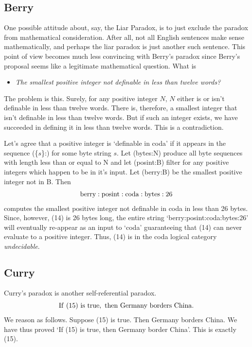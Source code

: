 \documentclass[11pt]{article}
\begin{document}
\subsection{Berry}

     One possible attitude about, say, the Liar Paradox, is to just exclude 
the paradox from mathematical consideration.  After all, not all English sentences make sense mathematically, and perhaps the liar paradox is just another such sentence.  
This point of view becomes much less convincing with Berry's paradox\cite{Berry} since Berry's proposal 
 seems like a legitimate mathematical question.  What is 
 \begin{itemize}
 \item {\it The smallest positive integer not definable in less than twelve words?}
 \end{itemize}
The problem is this.  Surely, for any positive integer $N$, $N$ either is or isn't definable in less than twelve words.
There is, therefore, a smallest integer that isn't definable in less than twelve words.  But if such an integer exists, we have succeeded in defining it in
less than twelve words.  This is a contradiction.

    Let's agree that a positive integer is `definable in coda' if it appears in the sequence (\{$s$\}:) for some 
byte string $s$.  Let (bytes:N) produce all byte sequences with length less than or equal to N and let 
(posint:B) filter for any positive integers which happen to be in it's input.  Let (berry:B) be the smallest 
positive integer not in B.  Then  
\begin{equation}
{\rm berry:posint:coda:bytes:26}
\end{equation}
computes the smallest positive integer not definable in coda in less than 26 bytes.  
Since, however, (14) is 26 bytes long, the entire string `berry:posint:coda:bytes:26' 
will eventually re-appear as an input to `coda' guaranteeing that (14) can never evaluate to a positive integer.  
Thus, (14) is in the coda logical category {\it undecidable}.  

\subsection{Curry}

Curry's paradox\cite{Curry} is another self-referential paradox.
\begin{equation}
{\rm If\ (15)\ is\ true,\ then\ Germany\ borders\ China.}
\end{equation}
We reason as follows.  Suppose (15) is true.  Then Germany borders China.  We have thus
proved `If (15) is true, then Germany border China'.  This is exactly (15).
\end{document}
